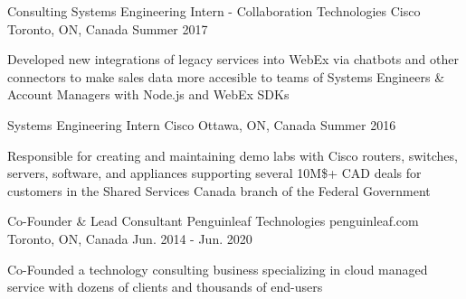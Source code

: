 \begin{cventries}
  \cventry
    {Consulting Systems Engineering Intern - Collaboration Technologies} %
    {Cisco} %
    {} %
    {Toronto, ON, Canada} %
    {Summer 2017} %
    {
      \begin{cvitems} %
        \item {Developed new integrations of legacy services into WebEx via chatbots and other connectors to make sales data more accesible to teams of Systems Engineers \& Account Managers with Node.js and WebEx SDKs}
      \end{cvitems}
    }

  \cventry
    {Systems Engineering Intern} %
    {Cisco} %
    {} %
    {Ottawa, ON, Canada} %
    {Summer 2016} %
    {
      \begin{cvitems} %
        \item {Responsible for creating and maintaining demo labs with Cisco routers, switches, servers, software, and appliances supporting several 10M\$+ CAD deals for customers in the Shared Services Canada branch of the Federal Government}
      \end{cvitems}
    }

  \cventry
    {Co-Founder \& Lead Consultant} %
    {Penguinleaf Technologies} %
    {penguinleaf.com} %
    {Toronto, ON, Canada} %
    {Jun. 2014 - Jun. 2020} %
    {
      \begin{cvitems} %
        \item {Co-Founded a technology consulting business specializing in cloud managed service with dozens of clients and thousands of end-users}
      \end{cvitems}
    }

\end{cventries}
